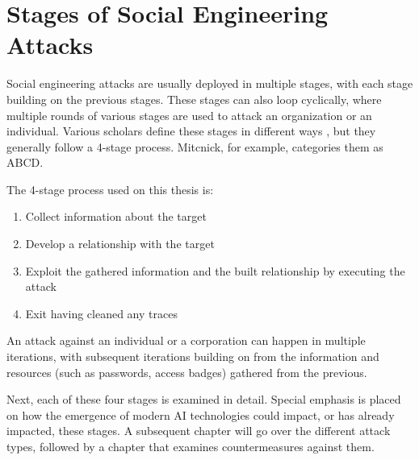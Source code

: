 



\chapter{Stages of Social Engineering Attacks\label{stages}}
\begin{comment}

Guides:
    - About 2 pages

TODO:
    [ ] Cover how SE attacks are cyclical

What to cover:
    - The 4-Stage process of SE
        - Gather OSINT
        - Build relationship
        - Exploit relationship / launch the attack
        - Exit / cover traces
    - Cyclical nature of SE attacks
    
Literature:
    - 

\end{comment}

Social engineering attacks are usually deployed in multiple stages, with each stage building on the previous stages. These stages can also loop cyclically, where multiple rounds of various stages are used to attack an organization or an individual. Various scholars define these stages in different ways \citep{mouton_social_2016}, but they generally follow a 4-stage process. Mitcnick, for example, categories them as ABCD.

The 4-stage process used on this thesis is:

\begin{enumerate}
    \item Collect information about the target
    \item Develop a relationship with the target
    \item Exploit the gathered information and the built relationship by executing the attack
    \item Exit having cleaned any traces
\end{enumerate}

An attack against an individual or a corporation can happen in multiple iterations, with subsequent iterations building on from the information and resources (such as passwords, access badges) gathered from the previous.

Next, each of these four stages is examined in detail. Special emphasis is placed on how the emergence of modern AI technologies could impact, or has already impacted, these stages. A subsequent chapter will go over the different attack types, followed by a chapter that examines countermeasures against them.

